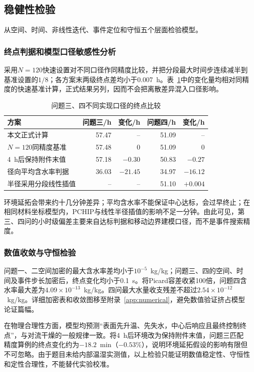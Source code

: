 \documentclass[UTF8,a4paper,zihao=-4,fontset=fandol]{ctexart}
\begin{document}
\subsection{稳健性检验}
从空间、时间、非线性迭代、事件定位和守恒五个层面检验模型。
\subsubsection{终点判据和模型口径敏感性分析}
采用$N=120$快速设置对不同口径作同精度比较，并把分段最大时间步连续减半到基准设置的$1/8$；各方案末两级终点差均小于0.007~h。表~\ref{tab:criterion-robust}中的变化量均相对同精度的快速基准计算，正式结果另列，因而不会把离散差异混入口径影响。
\begin{table}[htbp]
\centering\small
\caption{问题三、四不同实现口径的终点比较}\label{tab:criterion-robust}
\begin{tabular}{lrrrr}
\toprule
方案 & 问题三/h & 变化/h & 问题四/h & 变化/h\\\midrule
本文正式计算 & 57.47 & -- & 51.09 & --\\
$N=120$同精度基准 & 57.48 & 0 & 51.09 & 0\\
4~h后保持附件末值 & 57.18 & $-0.30$ & 50.83 & $-0.27$\\
径向平均含水率判据 & 36.03 & $-21.45$ & 34.97 & $-16.12$\\
半径采用分段线性插值 & -- & -- & 51.10 & $+0.004$\\\bottomrule
\end{tabular}
\end{table}
环境延拓会带来约十几分钟差异；平均含水率不能保证中心达标，会过早终止；在相同材料坐标模型内，PCHIP与线性半径插值的影响不足一分钟。由此可见，第三、四问的小时级偏差主要来自达标判据和移动边界建模口径，而不是事件搜索精度。

\subsubsection{数值收敛与守恒检验}
问题一、二空间加密的最大含水率差均小于$10^{-5}$~kg/kg；问题三、四的空间、时间及事件步长加密后，终点变化均小于0.1~s。将Picard容差收紧100倍，问题四含水率最大差为$4.09\times10^{-13}$~kg/kg。四问最大水量收支残差不超过$2.54\times10^{-12}$~kg/kg。详细加密表和收敛图移至附录~\ref{app:numerical}，避免数值验证挤占模型论证篇幅。

在物理合理性方面，模型均预测“表面先升温、先失水，中心后响应且最终控制终点”，与对流干燥的一般规律一致。将4~h后环境改为保持附件末值，问题三匹配精度算例的终点变化约为$-18.2$~min（$-0.53\%$），说明环境延拓假设的影响有限但不可忽略。由于题目未给内部温湿实测值，以上检验只能证明数值稳定性、守恒性和定性合理性，不能替代实验校准。
\end{document}
